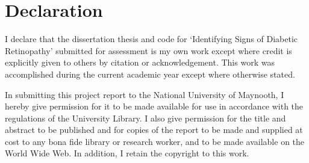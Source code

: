 \section*{Declaration}
I  declare  that  the  dissertation thesis and  code  for  ‘Identifying Signs of Diabetic Retinopathy’ submitted for assessment is my own work except where credit is explicitly given to others by citation or acknowledgement. This work was accomplished during  the  current  academic  year  except  where  otherwise stated. 

In  submitting  this  project  report  to  the  National University of Maynooth,  I hereby give permission for it to be made available for use in accordance with the regulations of the University Library. I also give permission for the title and abstract to be published  and  for  copies of  the  report  to be  made  and  supplied  at cost to  any bona  fide  library  or  research  worker,  and  to  be  made  available  on  the  World Wide Web. 
In addition, I retain the copyright to this work. 